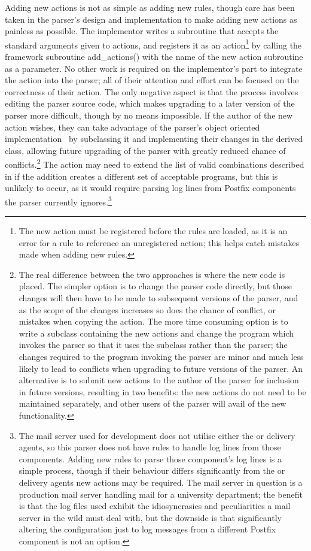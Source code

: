 \label{adding new actions}

Adding new actions is not as simple as adding new rules, though care has
been taken in the parser's design and implementation to make adding new
actions as painless as possible.  The implementor writes a subroutine that
accepts the standard arguments given to actions, and registers it as an
action\footnote{The new action must be registered before the rules are
loaded, as it is an error for a rule to reference an unregistered action;
this helps catch mistakes made when adding new rules.} by calling the
framework subroutine add\_actions() with the name of the new action
subroutine as a parameter.  No other work is required on the implementor's
part to integrate the action into the parser; all of their attention and
effort can be focused on the correctness of their action.  The only
negative aspect is that the process involves editing the parser source
code, which makes upgrading to a later version of the parser more
difficult, though by no means impossible.  If the author of the new action
wishes, they can take advantage of the parser's object oriented
implementation~\cite{Wikipedia-object-orientation} by subclassing it and
implementing their changes in the derived class, allowing future upgrading
of the parser with greatly reduced chance of conflicts.\footnote{The real
difference between the two approaches is where the new code is placed.  The
simpler option is to change the parser code directly, but those changes
will then have to be made to subsequent versions of the parser, and as the
scope of the changes increases so does the chance of conflict, or mistakes
when copying the action.  The more time consuming option is to write a
subclass containing the new actions and change the program which invokes
the parser so that it uses the subclass rather than the parser; the changes
required to the program invoking the parser are minor and much less likely
to lead to conflicts when upgrading to future versions of the parser.  An
alternative is to submit new actions to the author of the parser for
inclusion in future versions, resulting in two benefits: the new actions do
not need to be maintained separately, and other users of the parser will
avail of the new functionality.} The action may need to extend the list of
valid combinations described in  if the
addition creates a different set of acceptable programs, but this is
unlikely to occur, as it would require parsing log lines from Postfix
components the parser currently ignores.\footnote{The mail server used for
development does not utilise either the  or 
delivery agents, so this parser does not have rules to handle log lines
from those components.  Adding new rules to parse those component's log
lines is a simple process, though if their behaviour differs significantly
from the  or  delivery agents new actions may be
required.  The mail server in question is a production mail server handling
mail for a university department; the benefit is that the log files used
exhibit the idiosyncrasies and peculiarities a mail server in the wild must
deal with, but the downside is that significantly altering the
configuration just to log messages from a different Postfix component is
not an option.}


